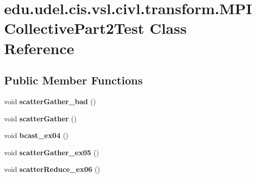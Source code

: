 \hypertarget{classedu_1_1udel_1_1cis_1_1vsl_1_1civl_1_1transform_1_1MPICollectivePart2Test}{}\section{edu.\+udel.\+cis.\+vsl.\+civl.\+transform.\+M\+P\+I\+Collective\+Part2\+Test Class Reference}
\label{classedu_1_1udel_1_1cis_1_1vsl_1_1civl_1_1transform_1_1MPICollectivePart2Test}
\subsection*{Public Member Functions}
\begin{DoxyCompactItemize}
\item 
\hypertarget{classedu_1_1udel_1_1cis_1_1vsl_1_1civl_1_1transform_1_1MPICollectivePart2Test_a0760d6e1b806b5767895286d5542fcec}{}void {\bfseries scatter\+Gather\+\_\+bad} ()\label{classedu_1_1udel_1_1cis_1_1vsl_1_1civl_1_1transform_1_1MPICollectivePart2Test_a0760d6e1b806b5767895286d5542fcec}

\item 
\hypertarget{classedu_1_1udel_1_1cis_1_1vsl_1_1civl_1_1transform_1_1MPICollectivePart2Test_af84b2be3b88c1b6e74aea9667eda4a62}{}void {\bfseries scatter\+Gather} ()\label{classedu_1_1udel_1_1cis_1_1vsl_1_1civl_1_1transform_1_1MPICollectivePart2Test_af84b2be3b88c1b6e74aea9667eda4a62}

\item 
\hypertarget{classedu_1_1udel_1_1cis_1_1vsl_1_1civl_1_1transform_1_1MPICollectivePart2Test_ad5c9120617fe0a180dd0a336ae6fb7ef}{}void {\bfseries bcast\+\_\+ex04} ()\label{classedu_1_1udel_1_1cis_1_1vsl_1_1civl_1_1transform_1_1MPICollectivePart2Test_ad5c9120617fe0a180dd0a336ae6fb7ef}

\item 
\hypertarget{classedu_1_1udel_1_1cis_1_1vsl_1_1civl_1_1transform_1_1MPICollectivePart2Test_af8911fab01e7d9878692e05aee51c13f}{}void {\bfseries scatter\+Gather\+\_\+ex05} ()\label{classedu_1_1udel_1_1cis_1_1vsl_1_1civl_1_1transform_1_1MPICollectivePart2Test_af8911fab01e7d9878692e05aee51c13f}

\item 
\hypertarget{classedu_1_1udel_1_1cis_1_1vsl_1_1civl_1_1transform_1_1MPICollectivePart2Test_abd65c7ff43e478489f895275aa11c84a}{}void {\bfseries scatter\+Reduce\+\_\+ex06} ()\label{classedu_1_1udel_1_1cis_1_1vsl_1_1civl_1_1transform_1_1MPICollectivePart2Test_abd65c7ff43e478489f895275aa11c84a}


\end{DoxyCompactItemize}
